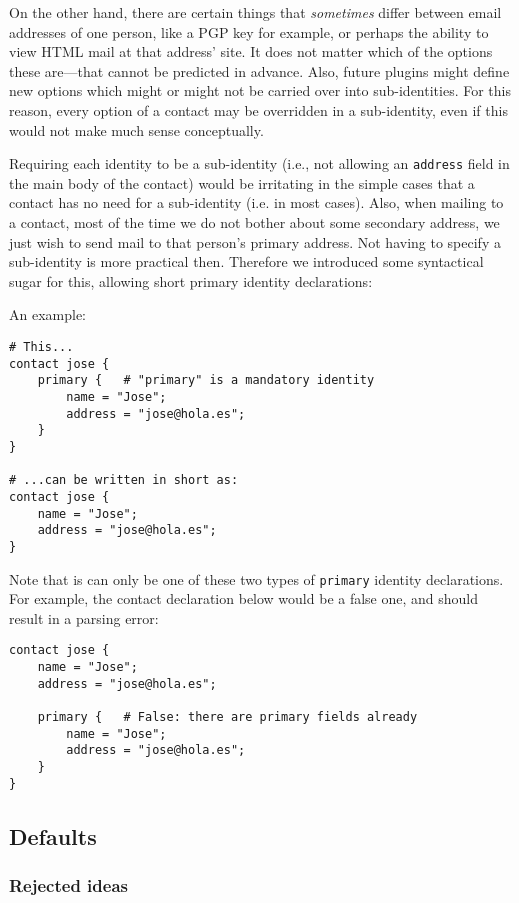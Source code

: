 \documentclass[a4paper]{article}
\begin{document}
On the other hand, there are certain things that \emph{sometimes} differ
between email addresses of one person, like a PGP key for example, or
perhaps the ability to view HTML mail at that address' site.  It does
not matter which of the options these are---that cannot be predicted in
advance.  Also, future plugins might define new options which might or
might not be carried over into sub-identities.  For this reason, every
option of a contact may be overridden in a sub-identity, even if this
would not make much sense conceptually.

Requiring each identity to be a sub-identity (i.e., not allowing an
\texttt{address} field in the main body of the contact) would be
irritating in the simple cases that a contact has no need for a
sub-identity (i.e. in most cases).  Also, when mailing to a contact,
most of the time we do not bother about some secondary address, we just
wish to send mail to that person's primary address.  Not having to
specify a sub-identity is more practical then.  Therefore we introduced
some syntactical sugar for this, allowing short primary identity
declarations:

An example:
\begin{verbatim}
# This...
contact jose {
    primary {	# "primary" is a mandatory identity
        name = "Jose";
        address = "jose@hola.es";
    }
}

# ...can be written in short as:
contact jose {
    name = "Jose";
    address = "jose@hola.es";
}
\end{verbatim}

Note that is can only be one of these two types of \texttt{primary} identity
declarations.  For example, the contact declaration below would be a false
one, and should result in a parsing error:

\begin{verbatim}
contact jose {
    name = "Jose";
    address = "jose@hola.es";

    primary {	# False: there are primary fields already
        name = "Jose";
        address = "jose@hola.es";
    }
}
\end{verbatim}


\subsection{Defaults}

\subsubsection{Rejected ideas}
\end{document}
